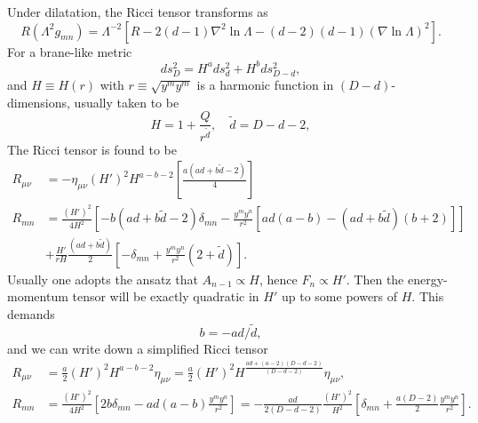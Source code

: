 Under dilatation, the Ricci tensor transforms as
\begin{equation}
R(\Lambda^2 g_{mn})
=\Lambda^{-2}[R-2(d-1)\nabla^2\ln\Lambda - (d-2)(d-1)(\nabla \ln \Lambda)^2].
\end{equation}
For a brane-like metric
\begin{equation}
ds_D^2 = H^{a}ds_{d}^2 + H^bds_{D-d}^2,
\end{equation}
and $H\equiv H(r)$ with $r\equiv \sqrt{y^my^m}$ is a harmonic function in $(D-d)$-dimensions, usually taken to be
\begin{equation}
H = 1 + \frac{Q}{r^{\tilde{d}}},\quad \tilde{d} = D-d-2,
\end{equation}
The Ricci tensor is found to be
\begin{equation}
\begin{aligned}
R_{\mu\nu}
&=-\eta_{\mu\nu}(H')^2H^{a-b-2}\left[\frac{a(ad+b\tilde d-2)}{4}\right]\\
R_{mn} 
&= \frac{(H')^2}{4H^2}\left[-b(ad+b\tilde{d}-2)\delta_{mn}-\frac{y^m y^n}{r^2}\left[ad(a-b)-(ad+b\tilde{d})(b+2)\right]\right]\\
&+\frac{H'}{rH}\frac{(ad+b\tilde{d})}{2}\left[-\delta_{mn} + \frac{y^m y^n}{r^2}(2+\tilde{d})\right].
\end{aligned}
\end{equation}
Usually one adopts the ansatz that $A_{n-1} \propto H$, hence $F_n \propto H'$.
Then the energy-momentum tensor will be exactly quadratic in $H'$ up to some powers of $H$.
This demands
\begin{equation}
b=-ad/\tilde{d},
\end{equation}
and we can write down a simplified Ricci tensor
\begin{equation}
\begin{aligned}
R_{\mu\nu} 
&= \frac{a}{2}(H')^2H^{a-b-2} \eta_{\mu\nu}
=\frac{a}{2}(H')^2H^{\frac{ad+(a-2)(D-d-2)}{(D-d-2)}} \eta_{\mu\nu},\\
R_{mn}
&=\frac{(H')^2}{4H^2}\left[2b\delta_{mn}-ad(a-b)\frac{y^my^n}{r^2}\right]
=-\frac{ad}{2(D-d-2)}\frac{(H')^2}{H^2}\left[
\delta_{mn}+\frac{a(D-2)}{2}\frac{y^m y^n}{r^2}
\right].
\end{aligned}
\end{equation}
